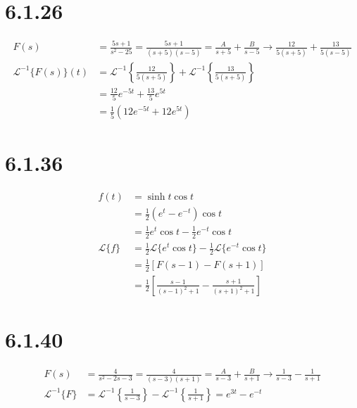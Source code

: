 \documentclass[11pt,a4paper]{article}
\newcommand{\Laplace}{\mathscr{L}}
\begin{document}
\section*{6.1.26}
\begin{align*}
	F(s) 
	&= \frac{5s+1}{s^2-25}
	= \frac{5s+1}{(s+5)(s-5)} 
	= \frac{A}{s+5} + \frac{B}{s-5}
	\rightarrow \frac{12}{5(s+5)} + \frac{13}{5(s-5)} \\
	\Laplace^{-1}\{F(s)\}(t) 
	&= \Laplace^{-1}\left\{\frac{12}{5(s+5)}\right\} + \Laplace^{-1}\left\{\frac{13}{5(s+5)}\right\} \\
	&= \frac{12}{5} e^{-5t} + \frac{13}{5} e^{5t} \\
	&= \frac{1}{5} (12e^{-5t} + 12e^{5t})
\end{align*}

\section*{6.1.36}
\begin{align*}
	f(t) 
	&= \sinh t \cos t \\
	&= \frac{1}{2} (e^t - e^{-t}) \cos t \\
	&= \frac{1}{2} e^t \cos t - \frac{1}{2} e^{-t} \cos t \\
	\Laplace\{f\}
	&= \frac{1}{2} \Laplace\{e^t\cos t\} - \frac{1}{2} \Laplace\{e^{-t}\cos t\} \\
	&= \frac{1}{2} [F(s-1) - F(s+1)] \\
	&= \frac{1}{2} \left[
		\frac{s-1}{(s-1)^2 + 1} - \frac{s+1}{(s+1)^2 + 1}
	\right]
\end{align*}

\section*{6.1.40}
\begin{align*}
	F(s)
	&= \frac{4}{s^2 - 2s - 3}
	= \frac{4}{(s-3)(s+1)}
	= \frac{A}{s-3} + \frac{B}{s+1}
	\rightarrow \frac{1}{s-3} - \frac{1}{s+1} \\
	\Laplace^{-1}\{F\}
	&= \Laplace^{-1}\left\{\frac{1}{s-3}\right\} - \Laplace^{-1}\left\{\frac{1}{s+1}\right\}
	= e^{3t} - e^{-t}
\end{align*}

\newpage
\end{document}
